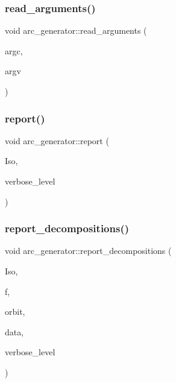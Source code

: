 \mbox{\label{classarc__generator_a40f6314a4dc00fdfaf5eea75a23edfc1}} 
\subsubsection{\texorpdfstring{read\+\_\+arguments()}{read\_arguments()}}
{\footnotesize\ttfamily void arc\+\_\+generator\+::read\+\_\+arguments (\begin{DoxyParamCaption}\item[{int}]{argc,  }\item[{const char $\ast$$\ast$}]{argv }\end{DoxyParamCaption})}

\mbox{\label{classarc__generator_a650f715bb3eec8fd1057e07e5b384f9a}} 
\subsubsection{\texorpdfstring{report()}{report()}}
{\footnotesize\ttfamily void arc\+\_\+generator\+::report (\begin{DoxyParamCaption}\item[{\mbox{\hyperlink{classisomorph}{isomorph}} \&}]{Iso,  }\item[{\mbox{\hyperlink{galois_8h_a09fddde158a3a20bd2dcadb609de11dc}{I\+NT}}}]{verbose\+\_\+level }\end{DoxyParamCaption})}

\mbox{\label{classarc__generator_a5444498b27b466918693d02db8db3bbb}} 
\subsubsection{\texorpdfstring{report\+\_\+decompositions()}{report\_decompositions()}}
{\footnotesize\ttfamily void arc\+\_\+generator\+::report\+\_\+decompositions (\begin{DoxyParamCaption}\item[{\mbox{\hyperlink{classisomorph}{isomorph}} \&}]{Iso,  }\item[{ofstream \&}]{f,  }\item[{\mbox{\hyperlink{galois_8h_a09fddde158a3a20bd2dcadb609de11dc}{I\+NT}}}]{orbit,  }\item[{\mbox{\hyperlink{galois_8h_a09fddde158a3a20bd2dcadb609de11dc}{I\+NT}} $\ast$}]{data,  }\item[{\mbox{\hyperlink{galois_8h_a09fddde158a3a20bd2dcadb609de11dc}{I\+NT}}}]{verbose\+\_\+level }\end{DoxyParamCaption})}

